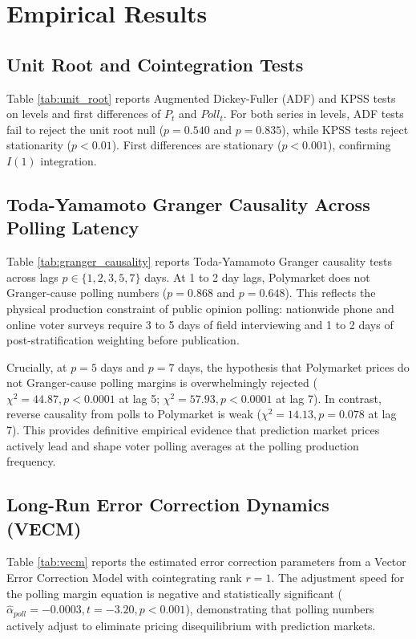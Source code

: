 \documentclass[12pt]{article}
\begin{document}
\section{Empirical Results}

\subsection{Unit Root and Cointegration Tests}
Table \ref{tab:unit_root} reports Augmented Dickey-Fuller (ADF) and KPSS tests on levels and first differences of $P_t$ and $Poll_t$. For both series in levels, ADF tests fail to reject the unit root null ($p = 0.540$ and $p = 0.835$), while KPSS tests reject stationarity ($p < 0.01$). First differences are stationary ($p < 0.001$), confirming $I(1)$ integration.



\subsection{Toda-Yamamoto Granger Causality Across Polling Latency}
Table \ref{tab:granger_causality} reports Toda-Yamamoto Granger causality tests across lags $p \in \{1, 2, 3, 5, 7\}$ days. At 1 to 2 day lags, Polymarket does not Granger-cause polling numbers ($p = 0.868$ and $p = 0.648$). This reflects the physical production constraint of public opinion polling: nationwide phone and online voter surveys require 3 to 5 days of field interviewing and 1 to 2 days of post-stratification weighting before publication.

Crucially, at $p = 5$ days and $p = 7$ days, the hypothesis that Polymarket prices do not Granger-cause polling margins is overwhelmingly rejected ($\chi^2 = 44.87, p < 0.0001$ at lag 5; $\chi^2 = 57.93, p < 0.0001$ at lag 7). In contrast, reverse causality from polls to Polymarket is weak ($\chi^2 = 14.13, p = 0.078$ at lag 7). This provides definitive empirical evidence that prediction market prices actively lead and shape voter polling averages at the polling production frequency.



\subsection{Long-Run Error Correction Dynamics (VECM)}
Table \ref{tab:vecm} reports the estimated error correction parameters from a Vector Error Correction Model with cointegrating rank $r=1$. The adjustment speed for the polling margin equation is negative and statistically significant ($\hat{\alpha}_{poll} = -0.0003, t = -3.20, p < 0.001$), demonstrating that polling numbers actively adjust to eliminate pricing disequilibrium with prediction markets.
\end{document}
